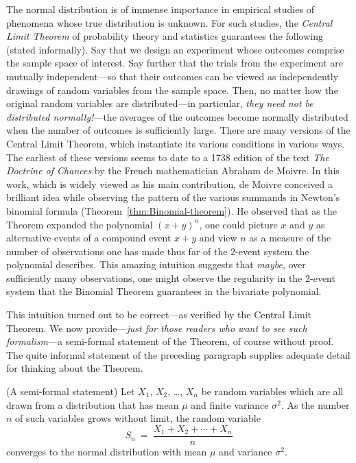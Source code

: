 The normal distribution is of immense importance in empirical studies of phenomena whose true distribution is unknown.  For such studies, the {\em Central Limit Theorem} of probability theory and statistics guarantees the following (stated informally).  Say that we design an experiment whose outcomes comprise the sample space of interest.  Say further that the trials from the experiment are mutually
independent---so that their outcomes can be viewed as independently drawings of random variables from the sample space.  Then, no matter how the original random variables are distributed---in particular,
{\em they need not be distributed normally!}---the averages of the outcomes become normally distributed when the number of outcomes is sufficiently large.  There are many versions of the Central Limit
Theorem, which instantiate its various conditions in various ways.  The earliest of these versions seems to date to a 1738 edition of the text {\it The Doctrine of Chances} by the French mathematician Abraham
de Moivre.  In this work, which is widely viewed as his main contribution, de Moivre conceived a brilliant idea while observing the pattern of the various summands in Newton's binomial formula
(Theorem~\ref{thm:Binomial-theorem}).  He observed that as the Theorem expanded the polynomial $(x+y)^n$, one could picture $x$ and $y$ as alternative events of a compound event $x+y$ and view $n$ as a measure of the number of observations one has made thus far of the $2$-event system the polynomial describes.  This amazing intuition suggests that {\em maybe}, over sufficiently many observations, one might observe the regularity in the $2$-event system that the Binomial Theorem guarantees in the bivariate polynomial.

\smallskip

\noindent
This intuition turned out to be correct---as verified by the Central Limit Theorem.   We now provide---{\em just for those readers who want to see such formalism}---a semi-formal statement of the Theorem, of course without proof.  The quite informal statement of the preceding paragraph supplies adequate detail for thinking about the Theorem.

\begin{theorem} {\rm (A semi-formal statement)}
\label{thm:CLT}
Let $X_1$, $X_2$, \ldots, $X_n$ be random variables which are all drawn from a distribution that has mean $\mu$ and finite variance $\sigma^2$.  As the number $n$ of such variables grows without limit, the random variable
\[ S_n \ = \ \frac{X_1 + X_2 + \cdots + X_n}{n} \]
converges to the normal distribution with mean $\mu$ and variance $\sigma^2$.
\end{theorem}

